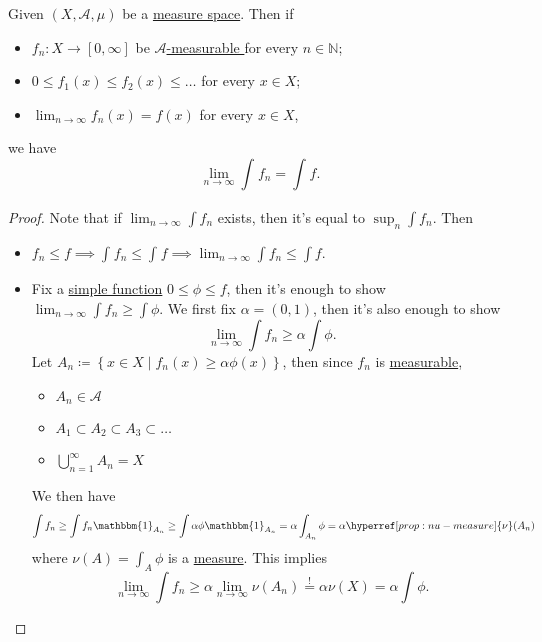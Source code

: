 \begin{theorem}\label{thm:MCT}
	Given \((X, \mathcal{A}, \mu)\) be a \hyperref[def:measure-space]{measure space}. Then if
	\begin{itemize}
		\item \(f_{n}\colon X\to [0, \infty ]\) be \hyperref[def:A-measurable-function]{\(\mathcal{A}\)-measurable } for every \(n\in\mathbb{N} \);
		\item \(0\leq f_1(x)\leq f_2(x)\leq \dots  \) for every \(x\in X\);
		\item \(\lim_{n \to \infty} f_{n}(x) = f(x)\) for every \(x\in X\),
	\end{itemize}
	we have
	\[
		\lim_{n \to \infty} \int_{}^{} f_{n} = \int_{}^{} f.
	\]
\end{theorem}
\begin{proof}
	Note that if \(\lim_{n \to \infty} \int f_{n}\) exists, then it's equal to \(\sup _n \int f_{n}\). Then
	\begin{itemize}
		\item \(f_{n}\leq f \implies \int_{}^{} f_{n}\leq \int_{}^{} f\implies \lim_{n \to \infty} \int f_{n}\leq \int f\).
		\item Fix a \hyperref[def:simple-function]{simple function} \(0\leq \phi \leq f\), then it's enough to show \(\lim_{n \to \infty} \int f_{n}\geq \int \phi \). We first fix \(\alpha = (0, 1)\), then it's also enough to show
		      \[
			      \lim_{n \to \infty} \int f_{n}\geq \alpha \int \phi.
		      \]
		      Let \(A_{n} \coloneqq \left\{x\in X\mid f_{n}(x) \geq \alpha \phi (x)\right\}\), then since \(f_{n}\) is \hyperref[def:measurable-function]{measurable},
		      \begin{itemize}
			      \item \(A_{n}\in \mathcal{A} \)
			      \item \(A_1\subset A_2\subset A_3\subset\dots  \)
			      \item \(\bigcup_{n=1}^{\infty} A_{n} = X\) 
		      \end{itemize}
		      We then have
		      \[
			      \int f_{n}\geq \int f_{n}\mathbbm{1}_{A_{n}} \geq \int \alpha \phi \mathbbm{1}_{A_{n}} = \alpha \int_{A_{n}}\phi = \alpha \hyperref[prop:nu-measure]{\nu} (A_{n})
		      \]
		      where \(\hyperref[prop:nu-measure]{\nu}(A) = \int_{A}^{} \phi \) is a \hyperref[def:measure]{measure}. This implies
		      \[
			      \lim_{n \to \infty} \int f_{n}\geq \alpha \lim_{n \to \infty} \hyperref[prop:nu-measure]{\nu } (A_{n}) \overset{\hyperref[thm:measure-space-continuity-from-below]{!}}{=} \alpha \hyperref[prop:nu-measure]{\nu}(X) = \alpha \int \phi.
		      \]
	\end{itemize}
\end{proof}

